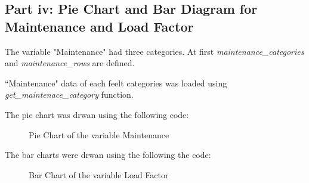 \subsection{Part iv: Pie Chart and Bar Diagram for Maintenance and Load Factor}
The variable "Maintenance" had three categories. At first \textit{maintenance\_categories} and \textit{maintenance\_rows} are defined.


``Maintenance" data of each feelt categories was loaded using \textit{get\_maintenace\_category} function.


The pie chart was drwan using the following code:


\begin{figure}[H]
    \centering


    \caption{Pie Chart of the variable Maintenance}
\end{figure}

The bar charts were drwan using the following the code:


\begin{figure}[H]
    \centering
    \caption{Bar Chart of the variable Load Factor}
\end{figure}
